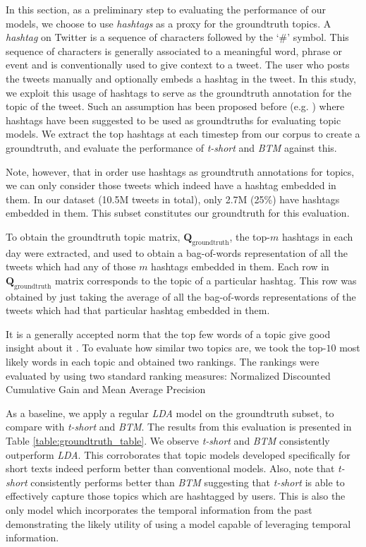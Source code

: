 In this section, as a preliminary step to evaluating the performance of our
models, we choose to use \emph{hashtags} as a proxy for the groundtruth
topics. A \emph{hashtag} on Twitter is a sequence of characters followed by the `\#' symbol.  This
sequence of characters is generally associated to a meaningful word,
phrase or event and is conventionally used to give context to a tweet.
The user who posts
the tweets manually and optionally embeds a hashtag in the tweet.  In this study,
we exploit this usage of hashtags to serve as the groundtruth annotation
for the topic of the tweet.
Such an assumption has been proposed before (e.g. \cite{tsur2012s}) where
hashtags have been suggested to be used as groundtruths for evaluating topic models.
We extract the top hashtags at each timestep from 
our corpus to create a groundtruth, and evaluate the performance 
of \emph{t-short} and \emph{BTM} against this.

Note, however, that in order use hashtags as groundtruth annotations for topics,
we can only consider those tweets which indeed have a hashtag embedded in
them.  In our dataset (10.5M tweets in total), only 2.7M (25\%) have hashtags
embedded in them. This subset constitutes our groundtruth for this evaluation.

To obtain the groundtruth topic matrix, $\textbf{Q}_\text{groundtruth}$, 
the top-$m$ hashtags in each day were extracted, and used to obtain a bag-of-words 
representation of all the tweets which had any of
those $m$ hashtags embedded in them.
Each row in $\textbf{Q}_\text{groundtruth}$ matrix corresponds to the topic of
a particular hashtag.  This row was obtained by just taking the average of all the bag-of-words representations of the tweets
which had that particular hashtag embedded in them.  

It is a generally accepted norm that the top few words of a topic give good insight
about it \cite{newman2010automatic,sekiguchi2006topic}.
To evaluate how similar two topics are, we took the top-$10$ most likely words in each topic and
obtained two rankings.  
The rankings were evaluated by using two standard ranking measures: Normalized
Discounted Cumulative Gain and Mean Average Precision

As a baseline, we apply a regular \emph{LDA} model on the groundtruth subset, 
to compare with \emph{t-short} and \emph{BTM}. 
The results from this evaluation is presented in Table \ref{table:groundtruth_table}.
We observe 
\emph{t-short} and \emph{BTM} consistently outperform \emph{LDA}.
This corroborates that topic models developed specifically for short texts
indeed perform better than conventional models.  Also, note that
\emph{t-short} consistently performs better than \emph{BTM}
suggesting that \emph{t-short} is able to effectively capture those topics which are hashtagged by users.
This is also the only model
which incorporates the temporal information from the past
demonstrating the likely utility of using a model capable of leveraging temporal information.

